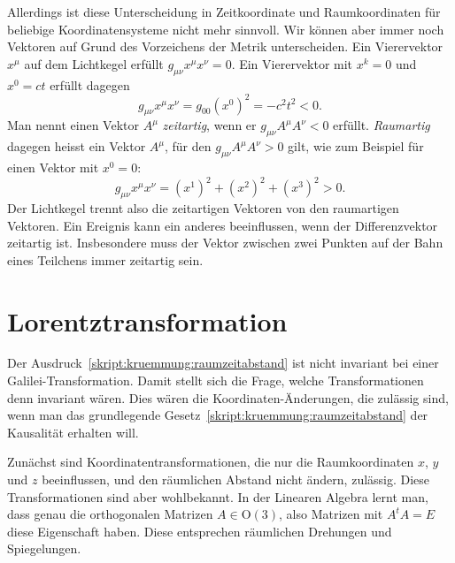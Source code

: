 Allerdings ist diese Unterscheidung in Zeitkoordinate und Raumkoordinaten
für beliebige Koordinatensysteme nicht mehr sinnvoll.
Wir können aber immer noch Vektoren auf Grund des Vorzeichens der 
Metrik unterscheiden.
Ein Vierervektor $x^\mu$ auf dem Lichtkegel erfüllt $g_{\mu\nu}x^\mu x^\nu=0$.
Ein Vierervektor  mit $x^k=0$ und $x^0=ct$ erfüllt dagegen
\[
g_{\mu\nu} x^\mu x^\nu
=
g_{00}(x^0)^2 = -c^2 t^2<0.
\]
Man nennt einen Vektor $A^\mu$ {\em zeitartig},
wenn er $g_{\mu\nu}A^\mu A^\nu<0$ 
erfüllt.
%
%
{\em Raumartig} dagegen heisst ein Vektor $A^\mu$, für den
$g_{\mu\nu} A^\mu A^\nu>0$
gilt, wie zum Beispiel für einen Vektor mit $x^0=0$:
\[
g_{\mu\nu}x^\mu x^\nu
=
(x^1)^2
+
(x^2)^2
+
(x^3)^2
>0.
\]
Der Lichtkegel trennt also die zeitartigen Vektoren von den raumartigen
Vektoren.
Ein Ereignis kann ein anderes beeinflussen, wenn der Differenzvektor
zeitartig ist.
Insbesondere muss der Vektor zwischen zwei Punkten auf der Bahn 
eines Teilchens immer zeitartig sein.

\section{Lorentztransformation%
\label{skript:speziell:section:lorentztransformation}}
Der Ausdruck~\eqref{skript:kruemmung:raumzeitabstand} ist nicht
invariant bei einer Galilei-Transformation.
Damit stellt sich die Frage, welche Transformationen denn
invariant wären.
Dies wären die Koordinaten-Änderungen, die zulässig sind, wenn
man das grundlegende Gesetz~\eqref{skript:kruemmung:raumzeitabstand}
der Kausalität erhalten will.

Zunächst sind Koordinatentransformationen, die nur die Raumkoordinaten
$x$, $y$ und $z$ beeinflussen, und den räumlichen Abstand nicht
ändern, zulässig.
Diese Transformationen sind aber wohlbekannt.
In der Linearen Algebra lernt man, dass genau die orthogonalen
Matrizen $A\in \textrm{O}(3)$, also Matrizen mit $A^tA=E$ diese
Eigenschaft haben.
Diese entsprechen räumlichen Drehungen und Spiegelungen.

